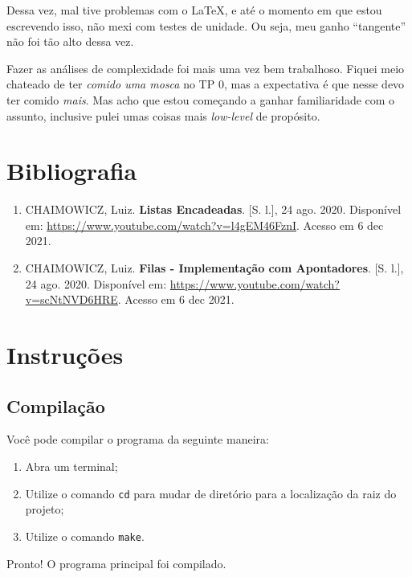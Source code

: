 \documentclass{article}
\def\code#1{\texttt{#1}}
\begin{document}
Dessa vez, mal tive problemas com o \LaTeX, e até o momento em que estou escrevendo isso, não mexi com testes de unidade. Ou seja, meu ganho ``tangente'' não foi tão alto dessa vez.

Fazer as análises de complexidade foi mais uma vez bem trabalhoso. Fiquei meio chateado de ter \textit{comido uma mosca} no TP 0, mas a expectativa é que nesse devo ter comido \textit{mais}. Mas acho que estou começando a ganhar familiaridade com o assunto, inclusive pulei umas coisas mais \textit{low-level} de propósito.


\section{Bibliografia}

\begin{enumerate}

    \item CHAIMOWICZ, Luiz. \textbf{Listas Encadeadas}. [S. l.], 24 ago. 2020. Disponível em: \url{https://www.youtube.com/watch?v=l4gEM46FznI}. Acesso em 6 dec 2021.

    \item CHAIMOWICZ, Luiz. \textbf{Filas - Implementação com Apontadores}. [S. l.], 24 ago. 2020. Disponível em: \url{https://www.youtube.com/watch?v=scNtNVD6HRE}. Acesso em 6 dec 2021.

\end{enumerate}


\newpage
\section*{Instruções}

\subsection*{Compilação}

Você pode compilar o programa da seguinte maneira:

\begin{enumerate}
    \item Abra um terminal;
    \item Utilize o comando \code{cd} para mudar de diretório para a localização da raiz do projeto;
    \item Utilize o comando \code{make}. 
\end{enumerate}

Pronto! O programa principal foi compilado. 
\end{document}
